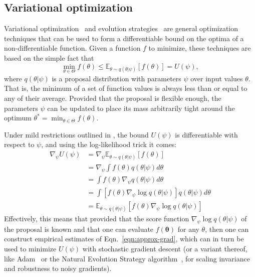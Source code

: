 \documentclass[twocolumn,superscriptaddress,aps]{revtex4-1}
\theoremstyle{plain}
\begin{document}
\subsection{Variational optimization}

Variational optimization~\cite{2012arXiv1212.4507S} and evolution strategies~\citep{2011arXiv1106.4487W} are general
optimization techniques that can be used to form a differentiable bound
on the optima of a non-differentiable function. Given a function $f$ to minimize,
these techniques are based on the simple fact that
\begin{equation}
    \min_{\theta \in \Theta} f(\theta) \leq \mathbb{E}_{\theta \sim q(\theta|\psi)} [f(\theta)] = U(\psi),
\end{equation}
where $q(\theta|\psi)$ is a proposal distribution with parameters $\psi$ over input values $\theta$.
That is, the minimum of a set of function values is always less than or equal
to any of their average. Provided that the proposal is flexible enough, the parameters $\psi$
can be updated to place its mass arbitrarily tight around the optimum $\theta^* = \min_{\theta \in \Theta} f(\theta)$.

Under mild restrictions outlined in  \citep{2012arXiv1212.4507S}, the bound
$U(\psi)$ is differentiable with respect to $\psi$, and using the log-likelihood
trick it comes:
\begin{align}\label{eqn:approx-grad}
    \nabla_\psi U(\psi) &= \nabla_\psi \mathbb{E}_{\theta \sim q(\theta|\psi)} [f(\theta)] \nonumber \\
    &= \nabla_\psi \int f(\theta)  q(\theta|\psi)  d\theta \nonumber \\
    &= \int f(\theta) \nabla_\psi q(\theta|\psi)  d\theta \nonumber \\
    &= \int \left[ f(\theta) \nabla_\psi \log q(\theta|\psi) \right]  q(\theta|\psi) d\theta \nonumber \\
    &= \mathbb{E}_{\theta \sim q(\theta|\psi)} [f(\theta) \nabla_\psi \log q(\theta|\psi)]
\end{align}
Effectively, this means that provided that the score function $\nabla_\psi \log
q(\theta|\psi)$ of the proposal is known and that one can evaluate
$f(\mathbf{\theta})$ for any $\theta$, then one can construct empirical
estimates of Eqn.~\ref{eqn:approx-grad}, which can in turn be used to minimize
$U(\psi)$ with stochastic gradient descent (or a variant thereof, like
Adam~\cite{2014arXiv1412.6980K} or the Natural Evolution Strategy
algorithm~\citep{2011arXiv1106.4487W}, for scaling invariance and
robustness to noisy gradients).
\end{document}
